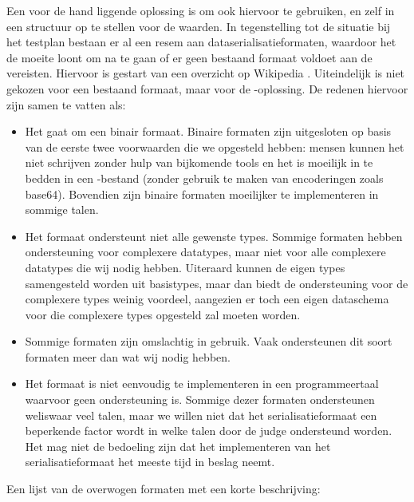 Een voor de hand liggende oplossing is om ook hiervoor  te gebruiken, en zelf in  een structuur op te stellen voor de waarden.
In tegenstelling tot de situatie bij het testplan bestaan er al een resem aan dataserialisatieformaten, waardoor het de moeite loont om na te gaan of er geen bestaand formaat voldoet aan de vereisten.
Hiervoor is gestart van een overzicht op Wikipedia \autocite{wiki2020}.
Uiteindelijk is niet gekozen voor een bestaand formaat, maar voor de -oplossing.
De redenen hiervoor zijn samen te vatten als:

\begin{itemize}
    \item Het gaat om een binair formaat.
    Binaire formaten zijn uitgesloten op basis van de eerste twee voorwaarden die we opgesteld hebben: mensen kunnen het niet schrijven zonder hulp van bijkomende tools en het is moeilijk in te bedden in een -bestand (zonder gebruik te maken van encoderingen zoals base64).
    Bovendien zijn binaire formaten moeilijker te implementeren in sommige talen.
    \item Het formaat ondersteunt niet alle gewenste types.
    Sommige formaten hebben ondersteuning voor complexere datatypes, maar niet voor alle complexere datatypes die wij nodig hebben.
    Uiteraard kunnen de eigen types samengesteld worden uit basistypes, maar dan biedt de ondersteuning voor de complexere types weinig voordeel, aangezien er toch een eigen dataschema voor die complexere types opgesteld zal moeten worden.
    \item Sommige formaten zijn omslachtig in gebruik.
    Vaak ondersteunen dit soort formaten meer dan wat wij nodig hebben.
    \item Het formaat is niet eenvoudig te implementeren in een programmeertaal waarvoor geen ondersteuning is.
    Sommige dezer formaten ondersteunen weliswaar veel talen, maar we willen niet dat het serialisatieformaat een beperkende factor wordt in welke talen door de judge ondersteund worden.
    Het mag niet de bedoeling zijn dat het implementeren van het serialisatieformaat het meeste tijd in beslag neemt.
\end{itemize}

Een lijst van de overwogen formaten met een korte beschrijving:

